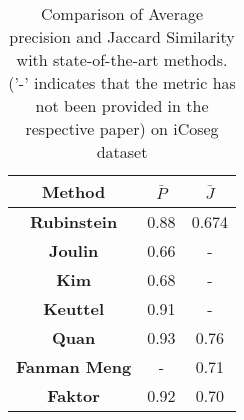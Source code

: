 \documentclass[conference]{IEEEtran}
\begin{document}
\begin{figure}[hbtp]
\end{figure}

\begin{figure}[hbtp]
\end{figure}



\begin{table}[]
\centering
\caption{Comparison of Average precision and Jaccard Similarity with state-of-the-art methods. ('-' indicates that the metric has not been provided in the respective paper) on iCoseg dataset}
\label{perficoseg}
\begin{tabular}{||c| c |c||}
\hline
\textbf{Method} & $\bar{\textit{P}}$ & $\bar{\textit{J}}$\\ \hline
\textbf{Rubinstein}\cite{Rubinstein13Unsupervised}                                       & 0.88                             & 0.674                            \\\hline
\textbf{Joulin}\cite{joulin2010discriminative}                                           & 0.66                             & -                                \\\hline
\textbf{Kim}\cite{kim2012multiple}                                              & 0.68                             & -                                \\\hline
\textbf{Keuttel}\cite{kuettel2012segmentation}                                          & 0.91                             & -                                \\\hline
\textbf{Quan}\cite{quan2016object}                                            & 0.93                             & 0.76                             \\\hline
\textbf{Fanman Meng}\cite{meng2016cosegmentation}                                      & -                                & 0.71                             \\\hline
\textbf{Faktor}\cite{faktor2013co}                                           & 0.92                             & 0.70                             \\\hline

\end{tabular}
\end{table}
\end{document}
